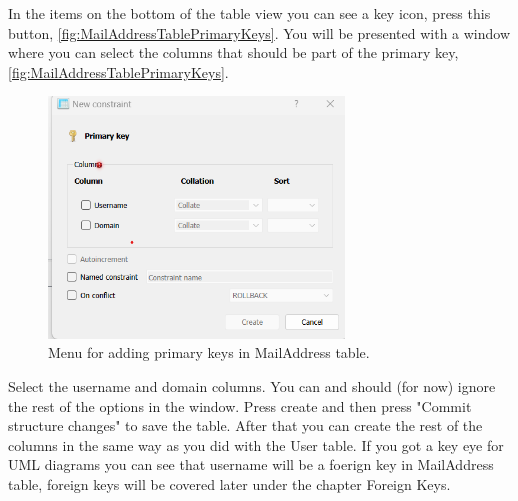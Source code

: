 \documentclass[a4paper,11pt,oneside]{article}
\begin{document}
\begin{sloppypar}
In the items on the bottom of the table view you can see a key icon, press this button, \autoref{fig:MailAddressTablePrimaryKeys}. You will be presented with a window where you can select the columns that should be part of the primary key, \autoref{fig:MailAddressTablePrimaryKeys}. 
\begin{figure}[!htb]
  \centering
  \includegraphics[width=0.7\textwidth]{sqlitestudio/create_mail_address/create_mail_blank_primary_keys.png}
  \caption{Menu for adding primary keys in MailAddress table.}
  \label{fig:MailAddressTablePrimaryKeys}
\end{figure}
Select the username and domain columns. You can and should (for now) ignore the rest of the options in the window. Press create and then press "Commit structure changes" to save the table. After that you can create the rest of the columns in the same way as you did with the User table. If you got a key eye for UML diagrams you can see that username will be a foerign key in MailAddress table, foreign keys will be covered later under the chapter Foreign Keys.  

\end{sloppypar}
\end{document}
